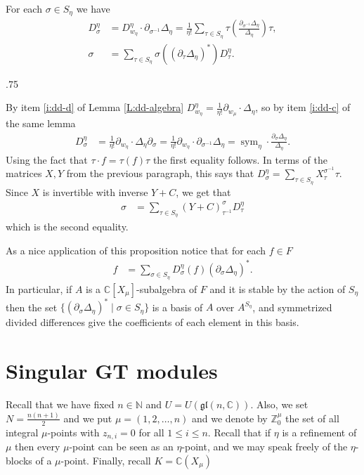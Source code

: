 \documentclass[11pt,fleqn]{article}
\makeatletter
\renewenvironment{proof}[1][\textit{Proof}]{\par
  \pushQED{\qed}%
  \normalfont \topsep.75\paraskip\relax
  \trivlist
  \item[\hskip\labelsep
        \itshape
    #1\@addpunct{.}]\ignorespaces
}{%
  \popQED\endtrivlist\@endpefalse
}
\newcommand\NN{\mathbb N}
\newcommand\CC{\mathbb C}
\newcommand\ZZ{\mathbb Z}
\newcommand\gl{\mathfrak{gl}}
\DeclareMathOperator\sym{sym}
\makeatother
\begin{document}
\begin{Proposition*}
For each $\sigma \in S_\eta$ we have
\begin{align*}
D_\sigma^\eta 
  &= D_{w_\eta}^\eta \cdot \partial_{\sigma^{-1}}\Delta_\eta
  = \frac{1}{\eta!}\sum_{\tau \in S_\eta} \tau \left(
    \frac{\partial_{\sigma^{-1}}\Delta_\eta}{\Delta_\eta} 
    \right) \tau,\\
\sigma
  &= \sum_{\tau \in S_\eta} 
    \sigma((\partial_\tau \Delta_\eta)^*)
    D_\tau^\eta. 
\end{align*}  
\end{Proposition*}
\begin{proof}
By item \ref{i:dd-d} of Lemma \ref{L:dd-algebra} $D^\eta_{w_\eta} = 
\frac{1}{\eta!} \partial_{w_\mu} \cdot \Delta_\eta $, so by item \ref{i:dd-c}
of the same lemma
\begin{align*}
D_\sigma^\eta 
  &= \frac{1}{\eta!} \partial_{w_\eta} \cdot \Delta_\eta \partial_\sigma
  = \frac{1}{\eta!} \partial_{w_\eta} \cdot \partial_{\sigma^{-1}} \Delta_\eta
  = \sym_\eta \cdot \frac{\partial_{\sigma}\Delta_\eta}{\Delta_\eta}.
\end{align*}
Using the fact that $\tau \cdot f = \tau(f) \tau$ the first equality follows.
In terms of the matrices $X, Y$ from the previous paragraph, this says that
$D_\sigma^\eta = \sum_{\tau \in S_\eta} X_\tau^{\sigma^{-1}} \tau$. Since $X$
is invertible with inverse $Y + C$, we get that
\begin{align*}
\sigma &= \sum_{\tau \in S_\eta} (Y+C)_{\tau^{-1}}^\sigma D_\tau^\eta
\end{align*}
which is the second equality.
\end{proof}

As a nice application of this proposition notice that for each $f \in F$ 
\begin{align*}
f &= \sum_{\sigma \in S_\eta} D_\sigma^\eta (f) 
  (\partial_{\sigma} \Delta_\eta)^*.
\end{align*}
In particular, if $A$ is a $\CC[X_\mu]$-subalgebra of $F$ and it is stable by 
the action of $S_\eta$ then the set $\{(\partial_\sigma \Delta_\eta)^* \mid 
\sigma \in S_\eta\}$ is a basis of $A$ over $A^{S_\eta}$, and symmetrized 
divided differences give the coefficients of each element in this basis. 

\section{Singular GT modules}
\label{SINGULAR-GT}
Recall that we have fixed $n \in \NN$ and $U = U(\gl(n, \CC))$. Also, we set 
$N = \frac{n(n+1)}{2}$ and we put $\mu = (1,2,\ldots, n)$ and we 
denote by $\ZZ^\mu_0$ the set of all integral $\mu$-points with $z_{n,i} = 0$ 
for all $1 \leq i \leq n$. Recall that if $\eta$ is a refinement of $\mu$ then 
every $\mu$-point can be seen as an $\eta$-point, and we may speak freely of 
the $\eta$-blocks of a $\mu$-point. Finally, recall $K = \CC(X_\mu)$
\end{document}
